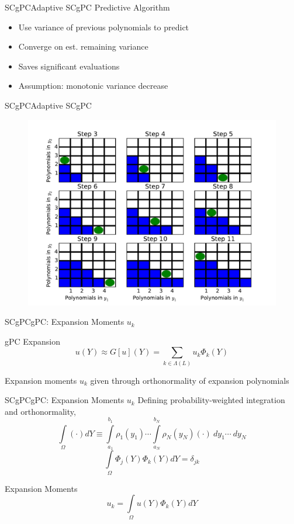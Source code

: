 \documentclass{beamer}
\begin{document}
\begin{frame}{SCgPC}{Adaptive SCgPC}%
  \vfill
  Predictive Algorithm
  \vfill
  \begin{itemize}
    \item Use variance of previous polynomials to predict
  \vfill
    \item Converge on est. remaining variance
  \vfill
    \item Saves significant evaluations
  \vfill
    \item Assumption: monotonic variance decrease
  \end{itemize}
  \vfill
\end{frame}

\begin{frame}{SCgPC}{Adaptive SCgPC}%
    \begin{figure}[h!]
      \centering
      \includegraphics[width=0.8\linewidth]{asc_block}
    \end{figure}
    \vfill
\end{frame}



\begin{frame}{SCgPC}{gPC: Expansion Moments $u_k$}\vspace{-20pt}
  \vfill
  \begin{block}{gPC Expansion}
    \[u(Y) \approx G[u](Y) = \sum_{k\in\Lambda(L)} u_k \Phi_k(Y)\]
  \end{block}
  \vfill
  Expansion moments $u_k$ given through orthonormality of expansion polynomials
  \vfill
\end{frame}


\begin{frame}{SCgPC}{gPC: Expansion Moments $u_k$}%
Defining probability-weighted integration and orthonormality,
  \[\int\limits_\Omega (\cdot) dY 
      \equiv 
      \int\limits_{a_1}^{b_1}\rho_1(y_1) \cdots \int\limits_{a_N}^{b_N}\rho_N(y_N) (\cdot)\ dy_1\cdots\ dy_N\]
  \[\int\limits_\Omega \Phi_{j}(Y)\Phi_k(Y) dY = \delta_{j k}\]
  \begin{alertblock}{Expansion Moments}
    \[u_k = \int\limits_\Omega u(Y)\Phi_k(Y) dY\]
  \end{alertblock}
\end{frame}
\end{document}
